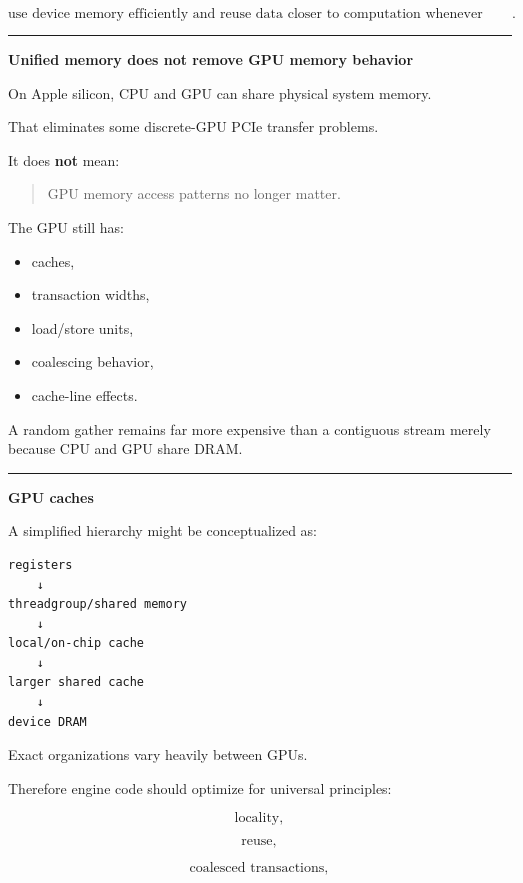 \[
\boxed{
\text{use device memory efficiently and reuse data closer to computation whenever possible}.
}
\]

\begin{center}\rule{0.5\linewidth}{0.5pt}\end{center}

\textbf{Unified memory does not remove GPU memory behavior}

On Apple silicon, CPU and GPU can share physical system memory.

That eliminates some discrete-GPU PCIe transfer problems.

It does \textbf{not} mean:

\begin{quote}
GPU memory access patterns no longer matter.
\end{quote}

The GPU still has:

\begin{itemize}
\tightlist
\item
  caches,
\item
  transaction widths,
\item
  load/store units,
\item
  coalescing behavior,
\item
  cache-line effects.
\end{itemize}

A random gather remains far more expensive than a contiguous stream merely because CPU and GPU share DRAM.

\begin{center}\rule{0.5\linewidth}{0.5pt}\end{center}

\textbf{GPU caches}

A simplified hierarchy might be conceptualized as:

\protect{}\label{q2nq6h}%
\begin{verbatim}
registers
    ↓
threadgroup/shared memory
    ↓
local/on-chip cache
    ↓
larger shared cache
    ↓
device DRAM
\end{verbatim}

Exact organizations vary heavily between GPUs.

Therefore engine code should optimize for universal principles:

\[
\text{locality},
\]

\[
\text{reuse},
\]

\[
\text{coalesced transactions},
\]

